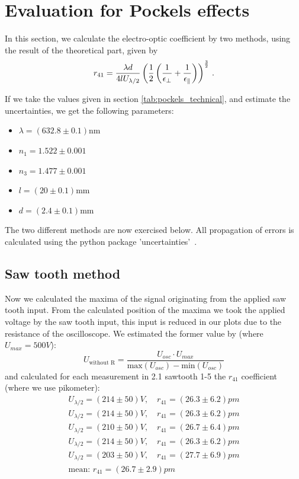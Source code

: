 \section{Evaluation for Pockels effects}
In this section, we calculate the electro-optic coefficient 
by two methods, using the result of the theoretical part, given by
\begin{equation}
    r_{41} = \frac{\lambda d}{4 l U_{\lambda / 2}} 
    \left(\frac{1}{2} \left(\frac{1}{\epsilon_\perp} + \frac{1}{\epsilon_\parallel}\right)\right)^{\frac{3}{2}}\, .
    \label{eq:r_41_U}
\end{equation}

If we take the values given in section \ref{tab:pockels_technical}, 
and estimate the uncertainties, we get the following parameters:
\begin{itemize}
\setlength\itemsep{0em}
\item[] $\lambda = (632.8\pm 0.1)$nm
\item[] $n_1     = 1.522\pm 0.001$
\item[] $n_3     = 1.477\pm 0.001$
\item[] $l       = ( 20\pm 0.1)$mm
\item[] $d       = (2.4\pm 0.1)$mm
\end{itemize}

The two different methods are now exercised below.
All propagation of errors is calculated using the python package 
'uncertainties'~\cite{uc}.

\subsection{Saw tooth method}
Now we calculated the maxima of the signal originating from the applied saw tooth input.
From the calculated position of the maxima we took the applied voltage by the saw tooth input,
this input is reduced in our plots due to the resistance of the oscilloscope.
We estimated the former value by (where $U_{max} = 500V$):
\begin{equation}
    U_{\textrm{without R}} =\frac{U_{osc}\cdot U_{max}}{\textrm{max}(U_{osc}) - \textrm{min}(U_{osc})}
\end{equation}
and calculated for each measurement in 2.1 sawtooth 1-5 the $r_{41}$ coefficient (where we 
    use pikometer):
\begin{align*}
    U_{\lambda/2} = \left(214 \pm 50\right)V,  \quad r_{41} =  (26.3 \pm 6.2)pm \\
    U_{\lambda/2} = \left(214 \pm 50\right)V , \quad r_{41} =  (26.3 \pm 6.2)pm \\
    U_{\lambda/2} = \left(210 \pm 50\right)V , \quad r_{41} =  (26.7 \pm 6.4)pm \\
    U_{\lambda/2} = \left(214 \pm 50\right)V , \quad r_{41} =  (26.3 \pm 6.2)pm \\
    U_{\lambda/2} = \left(203 \pm 50\right)V , \quad r_{41} =  (27.7 \pm 6.9)pm \\
    \text{mean: } r_{41}= (26.7 \pm 2.9) pm
\end{align*}
